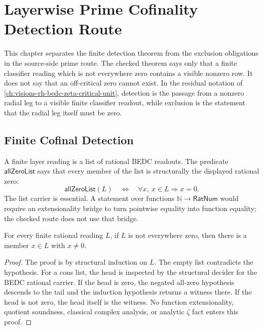 \chapter{Layerwise Prime Cofinality Detection Route}
\label{ch:visions-rh-layerwise-prime-cofinality}

This chapter separates the finite detection theorem from the exclusion
obligations in the source-side prime route. The checked theorem says only
that a finite classifier reading which is not everywhere zero contains a
visible nonzero row. It does not say that an off-critical zero cannot
exist. In the residual notation of
\autoref{ch:visions-rh-bedc-zeta-critical-unit}, detection is the passage
from a nonzero radial leg to a visible finite classifier readout, while
exclusion is the statement that the radial leg itself must be zero.

\section{Finite Cofinal Detection}
\label{sec:rh-layerwise-prime-cofinality-detection}

\begin{definition}
\label{def:rh-layerwise-prime-cofinality-reading}
A finite layer reading is a list of rational BEDC readouts. The predicate
$\mathsf{allZeroList}$ says that every member of the list is structurally
the displayed rational zero:
$$
\mathsf{allZeroList}(L)
\quad\Longleftrightarrow\quad
\forall x,\ x\in L \Rightarrow x=0.
$$
The list carrier is essential. A statement over functions
$\mathbb N\to \mathsf{RatNum}$ would require an extensionality bridge to
turn pointwise equality into function equality; the checked route does
not use that bridge.
\end{definition}

\begin{theorem}
\label{thm:rh-layerwise-prime-cofinality-separating}
For every finite rational reading $L$, if $L$ is not everywhere zero,
then there is a member $x\in L$ with $x\neq 0$.
\end{theorem}

\begin{proof}
The proof is by structural induction on $L$. The empty list contradicts
the hypothesis. For a cons list, the head is inspected by the structural
decider for the BEDC rational carrier. If the head is zero, the negated
all-zero hypothesis descends to the tail and the induction hypothesis
returns a witness there. If the head is not zero, the head itself is the
witness. No function extensionality, quotient soundness, classical
complex analysis, or analytic $\zeta$ fact enters this proof.
\end{proof}

